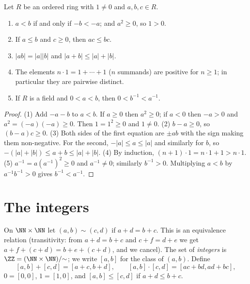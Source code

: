\begin{lemma}\label{number-systems:lemma-ordered-field}
Let $R$ be an ordered ring with $1 \neq 0$ and $a, b, c \in R$.
\begin{enumerate}
\item $a < b$ if and only if $-b < -a$; and $a^2 \geq 0$, so $1 > 0$.
\item If $a \leq b$ and $c \geq 0$, then $ac \leq bc$.
\item $|ab| = |a||b|$ and $|a + b| \leq |a| + |b|$.
\item The elements $n \cdot 1 = 1 + \cdots + 1$ ($n$ summands) are positive for
$n \geq 1$; in particular they are pairwise distinct.
\item If $R$ is a field and $0 < a < b$, then $0 < b^{-1} < a^{-1}$.
\end{enumerate}
\end{lemma}

\begin{proof}
(1) Add $-a - b$ to $a < b$. If $a \geq 0$ then $a^2 \geq 0$; if $a < 0$ then
$-a > 0$ and $a^2 = (-a)(-a) \geq 0$. Then $1 = 1^2 \geq 0$ and $1 \neq 0$.
(2) $b - a \geq 0$, so $(b - a)c \geq 0$.
(3) Both sides of the first equation are $\pm ab$ with the sign making them
non-negative. For the second, $-|a| \leq a \leq |a|$ and similarly for $b$, so
$-(|a| + |b|) \leq a + b \leq |a| + |b|$.
(4) By induction, $(n + 1) \cdot 1 = n \cdot 1 + 1 > n \cdot 1$.
(5) $a^{-1} = a (a^{-1})^2 \geq 0$ and $a^{-1} \neq 0$; similarly $b^{-1} > 0$.
Multiplying $a < b$ by $a^{-1} b^{-1} > 0$ gives $b^{-1} < a^{-1}$.
\end{proof}

\section{The integers}\label{number-systems:section-integers}

\begin{definition}\label{number-systems:definition-integers}
On $\NN \times \NN$ let $(a, b) \sim (c, d)$ if $a + d = b + c$. This is an
equivalence relation (transitivity: from $a + d = b + c$ and $c + f = d + e$ we
get $a + f + (c + d) = b + e + (c + d)$, and we cancel). The set of
\emph{integers} is $\ZZ = (\NN \times \NN)/{\sim}$; we write $[a, b]$ for the
class of $(a, b)$. Define
\[
[a, b] + [c, d] = [a + c, b + d], \qquad
[a, b] \cdot [c, d] = [ac + bd, ad + bc],
\]
$0 = [0, 0]$, $1 = [1, 0]$, and $[a, b] \leq [c, d]$ if $a + d \leq b + c$.
\end{definition}

